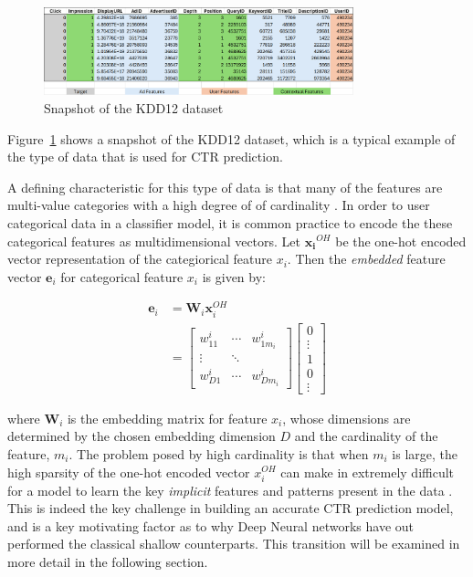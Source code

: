 \documentclass{mldsmsc}
\begin{document}
\begin{figure}[h]
\centering
\includegraphics[width=0.8\textwidth]{../figures/kdd12_snapshot.png}
\caption{Snapshot of the KDD12 dataset \cite{RefWorks:aden2012kdd}}
\label{fig:kdd12-snapshot}
\end{figure}

Figure~\ref{fig:kdd12-snapshot} shows a snapshot of the KDD12 dataset, which is a typical example of 
the type of data that is used for CTR prediction.

A defining characteristic for this type of data is that many of the features are multi-value categories with 
a high degree of of cardinality \citep{RefWorks:he2017neural}. In order to user categorical data
in a classifier model, it is common practice to encode the these categorical features
as multidimensional vectors. Let $\mathbf{x_i}^{OH}$ be the one-hot encoded vector
representation of the categiorical feature $x_i$. Then the \emph{embedded} feature vector
$\mathbf{e}_i$ for categorical feature $x_i$ is given by:

\begin{equation}
\begin{split}
\mathbf{e}_i &= \mathbf{W}_i \mathbf{x}_i^{OH}\\
&= \begin{bmatrix}
w_{11}^i & \cdots & w_{1 m_i}^i\\
\vdots & \ddots & \\
w_{D 1}^i & \cdots & w_{D m_i}^i
\end{bmatrix}
\begin{bmatrix}
    0 \\
    \vdots \\
    1 \\
    0\\
    \vdots
\end{bmatrix}
\end{split}
\end{equation}

where $\mathbf{W}_i$ is the embedding matrix for feature $x_i$, whose dimensions are determined
by the chosen embedding dimension $D$ and the cardinality of the feature, $m_i$.
The problem posed by high cardinality is that when $m_i$ is large, the high
sparsity of the one-hot encoded vector $x_i^{OH}$ can make in extremely difficult
for a model to learn the key \emph{implicit} features and patterns present in the
data \citep{RefWorks:gu2021ad}. This is indeed the key challenge in building an
accurate CTR prediction model, and is a key motivating factor as to why Deep Neural
networks have out performed the classical shallow counterparts. This transition will be examined
in more detail in the following section.
\end{document}
